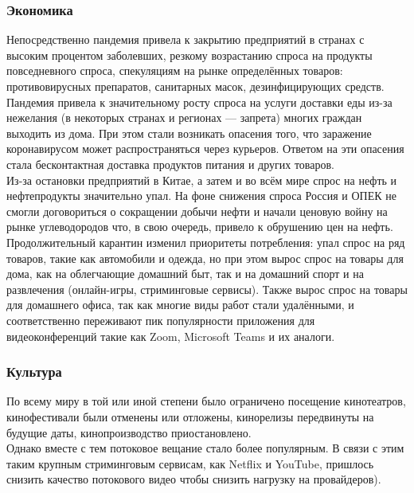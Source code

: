 \documentclass[a4paper, 12pt]{extarticle}
\begin{document}
\subsubsection{Экономика}

Непосредственно пандемия привела к закрытию предприятий в странах с высоким
процентом заболевших, резкому возрастанию спроса на продукты повседневного
спроса, спекуляциям на рынке определённых товаров: противовирусных препаратов,
санитарных масок, дезинфицирующих средств.
\\

Пандемия привела к значительному росту спроса на услуги доставки еды из-за
нежелания (в некоторых странах и регионах — запрета) многих граждан выходить из
дома. При этом стали возникать опасения того, что заражение коронавирусом может
распространяться через курьеров. Ответом на эти опасения стала бесконтактная
доставка продуктов питания и других товаров.
\\

Из-за остановки предприятий в Китае, а затем и во всём мире спрос на нефть и
нефтепродукты значительно упал. На фоне снижения спроса Россия и ОПЕК не смогли
договориться о сокращении добычи нефти и начали ценовую войну на рынке
углеводородов что, в свою очередь, привело к обрушению цен на нефть.
\\

Продолжительный карантин изменил приоритеты потребления: упал спрос на ряд
товаров, такие как автомобили и одежда, но при этом вырос спрос на товары для
дома, как на облегчающие домашний быт, так и на домашний спорт и на развлечения
(онлайн-игры, стриминговые сервисы). Также вырос спрос на товары для домашнего
офиса, так как многие виды работ стали удалёнными, и соответственно переживают
пик популярности приложения для видеоконференций такие как Zoom, Microsoft
Teams и их аналоги.

\subsubsection{Культура}
По всему миру в той или иной степени было ограничено посещение кинотеатров,
кинофестивали были отменены или отложены, кинорелизы передвинуты на будущие
даты, кинопроизводство приостановлено.
\\

Однако вместе с тем потоковое вещание стало более популярным. В связи с этим
таким крупным стриминговым сервисам, как Netflix и YouTube, пришлось снизить качество потокового видео чтобы
снизить нагрузку на провайдеров).
\\
\end{document}
